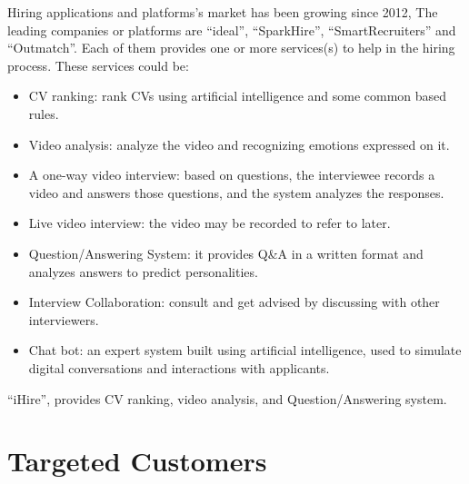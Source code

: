 

Hiring applications and platforms’s market has been growing since 2012, The leading companies or platforms are “ideal”\cite{ideal}, “SparkHire”\cite{SparkHire}, “SmartRecruiters”\cite{SmartRecruiters} and “Outmatch”. Each of them provides one or more services(s) to help in the hiring process. These services could be:

\begin{itemize}
  \item CV ranking: rank CVs using artificial intelligence and some common based rules.
  \item Video analysis: analyze the video and recognizing emotions expressed on it.
  \item A one-way video interview: based on questions, the interviewee records a video and answers those questions, and the system analyzes the responses.
  \item Live video interview: the video may be recorded to refer to later.
  \item Question/Answering System: it provides Q\&A in a written format and analyzes answers to predict personalities.
  \item Interview Collaboration: consult and get advised by discussing with other interviewers.
  \item Chat bot: an expert system built using artificial intelligence, used to simulate digital conversations and interactions with applicants.
\end{itemize}

“iHire”, provides CV ranking, video analysis, and Question/Answering system.



\section{Targeted Customers}

